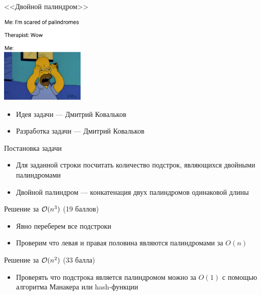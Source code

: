 \begin{frame}
  \begin{center}
    \LARGE <<Двойной палиндром>>
  \end{center}

  \begin{center}
      \includegraphics[width=4cm]{memes/b-meme.jpg}
  \end{center}

  \begin{itemize}
  \item Идея задачи --- Дмитрий Ковальков
  \item Разработка задачи --- Дмитрий Ковальков
  \end{itemize}

\end{frame}

\begin{frame}{Постановка задачи}

  \begin{itemize}
  \item Для заданной строки посчитать количество подстрок, являющихся двойными палиндромами
  \item Двойной палиндром --- конкатенация двух палиндромов одинаковой длины
  \end{itemize}
  
\end{frame}

\begin{frame}{Решение за $\mathcal{O}(n^3)$ (19 баллов)}
  \begin{itemize}
  \item Явно переберем все подстроки
  \item Проверим что левая и правая половина являются палиндромами за $O(n)$
  \end{itemize}
\end{frame}

\begin{frame}{Решение за $\mathcal{O}(n^2)$ (33 балла)}
  \begin{itemize}
  \item Проверять что подстрока является палиндромом можно за $O(1)$ с помощью алгоритма Манакера или hash-функции
  \end{itemize}
\end{frame}

